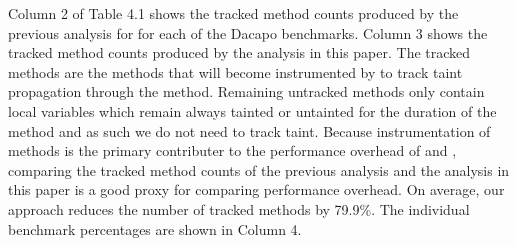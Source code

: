 \begin{center}
\end{center}

Column 2 of Table 4.1 shows the tracked method counts produced by the
previous analysis for \phosphorpi{} for each of the Dacapo
benchmarks. Column 3 shows the tracked method counts produced by the
analysis in this paper. The tracked methods are the methods that will
become instrumented by \phosphor{} to track taint propagation through the
method. Remaining untracked methods only contain local variables which
remain always tainted or untainted for the duration of the method and
as such we do not need to track taint. Because instrumentation of
methods is the primary contributer to the performance overhead of
\phosphor{} and \phosphorpi{}, comparing the tracked method
counts of the previous analysis and the analysis in this paper is a
good proxy for comparing performance overhead. On average, our
approach reduces the number of tracked methods by 79.9\%. The
individual benchmark percentages are shown in Column 4.

